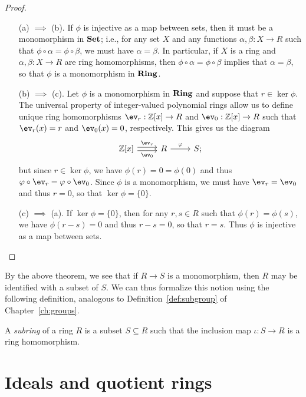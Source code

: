 \begin{proof}\(\)

    \begin{enumerate}[wide]
        \item[(a) \(\implies\) (b).] If \(\phi\) is injective as a map between
        sets, then it must be a monomorphism in \(\mathbf{Set}\); i.e., for any set
        \(X\) and any functions \(\alpha, \beta: X \to R\) such that \(\phi
        \circ \alpha = \phi \circ \beta\), we must have \(\alpha = \beta\). In
        particular, if \(X\) is a ring and \(\alpha, \beta: X \to R\) are ring
        homomorphisms, then \(\phi \circ \alpha = \phi \circ \beta\) implies
        that \(\alpha = \beta\), so that \(\phi\) is a monomorphism in
        \(\mathbf{Ring}\).
        
        \item[(b) \(\implies\) (c).] Let \(\phi\) is a monomorphism in \(\mathbf{Ring}\)
        and suppose that \(r \in \ker \phi\). The universal property of
        integer-valued polynomial rings allow us to define unique ring
        homomorphisms \(\ev_r : \Z[x] \to R\) and \(\ev_0: \Z[x] \to R\) such
        that \(\ev_r(x) = r\) and \(\ev_0(x) = 0\), respectively. This gives us
        the diagram
        \[
            \begin{tikzcd}
                \Z[x]\arrow[r,shift left=2pt,"\ev_r"]\arrow[r,shift right=2pt,"\ev_0", swap] &  R \arrow[r,"\phi"] & S;
            \end{tikzcd}
        \]
        but since \(r \in \ker \phi\), we have \(\phi(r) = 0 = \phi(0)\) and
        thus \(\phi \circ \ev_r = \phi \circ \ev_0\). Since \(\phi\) is a
        monomorphism, we must have \(\ev_r = \ev_0\) and thus \(r = 0\), so that
        \(\ker \phi = \{0\}\).

        \item[(c) \(\implies\) (a).] If \(\ker \phi = \{0\}\), then for any \(r,
        s \in R\) such that \(\phi(r) = \phi(s)\), we have \(\phi(r - s) = 0\)
        and thus \(r - s = 0\), so that \(r = s\). Thus \(\phi\) is injective as
        a map between sets.
    \end{enumerate}
\end{proof}

By the above theorem, we see that if \(R \to S\) is a monomorphism, then \(R\)
may be identified with a subset of \(S\). We can thus formalize this notion
using the following definition, analogous to Definition~\ref{def:subgroup} of
Chapter~\ref{ch:groups}.

\begin{definition}
    A \emph{subring} of a ring \(R\) is a subset \(S \subseteq R\) such that the
    inclusion map \(\iota: S \to R\) is a ring homomorphism. 
\end{definition}


\section{Ideals and quotient rings}
\label{sec:ideals}